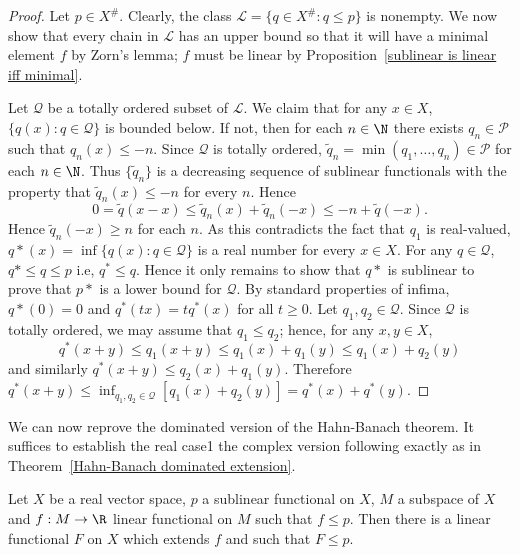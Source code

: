 \begin{proof}
Let $p\in X^{\#}$. Clearly, the class $\mathscr{L}=\{q\in X^{\#}:q\leq p\}$ is nonempty. We now show that every chain in $\mathscr{L}$ has an upper bound so that it will have a minimal element $f$ by Zorn's lemma; $f$ must be linear by Proposition~\ref{sublinear is linear iff minimal}.\par
Let $\mathscr{Q}$ be a totally ordered subset of $\mathscr{L}$. We claim that for any $x\in X$, $\{q(x):q\in\mathscr{Q}\}$ is bounded below. If not, then for each $n\in\N$ there exists $q_n\in\mathscr{P}$ such that $q_n(x)\leq -n$. Since $\mathscr{Q}$ is totally ordered, $\widetilde{q}_n=\min(q_1,\dots,q_n)\in\mathscr{P}$ for each $n\in\N$. Thus $\{\widetilde{q}_n\}$ is a decreasing sequence of sublinear functionals with the property that $\widetilde{q}_n(x)\leq -n$ for every $n$. Hence
\[0=\widetilde{q}(x-x)\leq \widetilde{q}_n(x)+\widetilde{q}_n(-x)\leq -n+\widetilde{q}(-x).\]
Hence $\widetilde{q}_n(-x)\geq n$ for each $n$. As this contradicts the fact that $q_1$ is real-valued, $q*(x)=\inf\{q(x):q\in\mathscr{Q}\}$ is a real number for every $x\in X$. For any $q\in\mathscr{Q}$, $q*\leq q\leq p$ i.e, $q^*\leq q$. Hence it only remains to show that $q*$ is sublinear to prove that $p*$ is a lower bound for $\mathscr{Q}$. By standard properties of infima, $q*(0)=0$ and $q^*(tx)=tq^*(x)$ for all $t\geq 0$. Let $q_1,q_2\in\mathscr{Q}$. Since $\mathscr{Q}$ is totally ordered, we may assume that $q_1\leq q_2$; hence, for any $x,y\in X$,
\[q^*(x+y)\leq q_1(x+y)\leq q_1(x)+q_1(y)\leq q_1(x)+q_2(y)\]
and similarly $q^*(x+y)\leq q_2(x)+q_1(y)$. Therefore $q^*(x+y)\leq\inf_{q_1,q_2\in\mathscr{Q}}[q_1(x)+q_2(y)]=q^*(x)+q^*(y)$.
\end{proof}
We can now reprove the dominated version of the Hahn-Banach theorem.
It suffices to establish the real case1 the complex version following exactly as in Theorem~\ref{Hahn-Banach dominated extension}.
\begin{theorem}
Let $X$ be a real vector space, $p$ a sublinear functional on $X$, $M$ a subspace of $X$ and $f:M\to\R$ linear functional on $M$ such that $f\leq p$. Then there is a linear functional $F$ on $X$ which extends $f$ and such that $F\leq p$.
\end{theorem}
